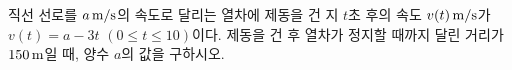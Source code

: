 직선 선로를 $a\mkern3mu \mathrm{m/s}$의 속도로 달리는 열차에 제동을 건 지 $t$초 후의 속도 $v(t)\mkern3mu \mathrm{m/s}$가 $v(t)=a-3t$ $(0\le t\le 10)$이다. 제동을 건 후 열차가 정지할 때까지 달린 거리가 $150\mkern3mu \mathrm{m}$일 때, 양수 $a$의 값을 구하시오.

